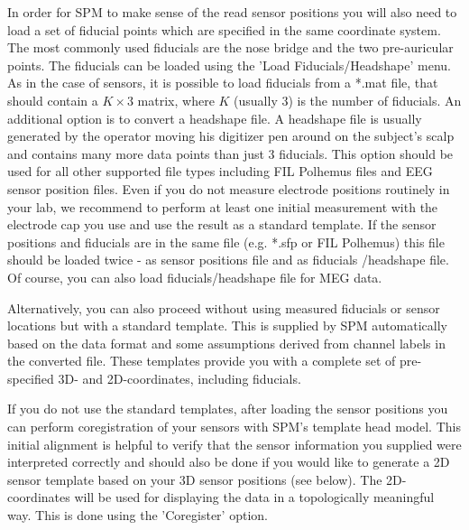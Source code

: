 In order for SPM to make sense of the read sensor positions you will
also need to load a set of fiducial points which are specified in the
same 
coordinate system. The most commonly used fiducials are the nose
bridge and the two pre-auricular points. The fiducials can be loaded
using the 'Load Fiducials/Headshape' menu. As in the case of sensors,
it is possible to load fiducials from a *.mat file, that should
contain a $K \times 3$ matrix, where $K$ (usually 3) is the number of
fiducials. An additional option is to convert a headshape file. A
headshape file is usually generated by the operator moving his
digitizer pen around on the subject's scalp and contains many more data 
points than just 3 fiducials. This option should be used for all other
supported file types including FIL Polhemus files and EEG sensor
position files. Even if you do not
measure electrode positions routinely in your lab, we recommend to
perform at least one initial measurement with the electrode cap you
use and use the result as a standard template. If the sensor positions
and fiducials are in the same file (e.g. *.sfp or FIL Polhemus) this
file should be loaded twice - as sensor positions file and as
fiducials /headshape file. Of course, you can also load
fiducials/headshape file for MEG data.

Alternatively, you can also proceed without using measured fiducials
or sensor locations but with a standard template. This is supplied by
SPM automatically based on the data format and some assumptions
derived from channel labels in the converted file. These templates
provide you with a complete set of pre-specified 3D- and
2D-coordinates, including fiducials.

If you do not use the standard templates, after loading the sensor
positions you can perform coregistration of your sensors with SPM's
template head model. This initial alignment is helpful to verify that
the sensor information you supplied were interpreted correctly and
should also be done if you would like to generate a 2D sensor template
based on your 3D sensor positions (see below). The 2D-coordinates will
be used for displaying the data in a topologically meaningful way. This
is done using the 'Coregister' option.

